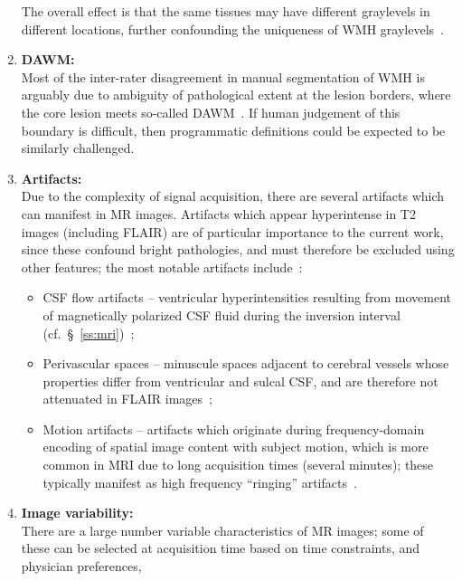 \begin{enumerate}[itemsep=0pt,topsep=0pt]
    The overall effect is that
    the same tissues may have different graylevels in different locations,
    further confounding the uniqueness of WMH graylevels~\cite{Wardlaw2015}.
  \item\label{chauto:dawm}
  \textbf{DAWM:}\\
    Most of the inter-rater disagreement in manual segmentation of WMH is arguably due to
    ambiguity of pathological extent at the lesion borders,
    where the core lesion meets so-called DAWM~\cite{Ge2003}.
    If human judgement of this boundary is difficult,
    then programmatic definitions could be expected to be similarly challenged.
  \item\label{chauto:artifacts}
  \textbf{Artifacts:}\\
    Due to the complexity of signal acquisition,
    there are several artifacts which can manifest in MR images.
    Artifacts which appear hyperintense in T2 images (including FLAIR)
    are of particular importance to the current work, since these confound bright pathologies,
    and must therefore be excluded using other features;
    the most notable artifacts include~\cite{Wardlaw2015}:
    \begin{itemize}[itemsep=0pt,topsep=0pt]
      \item CSF flow artifacts --
      ventricular hyperintensities resulting from movement of magnetically polarized CSF fluid
      during the inversion interval (cf.~\S~\ref{ss:mri})~\cite{Bakshi2000};
      \item Perivascular spaces --
      minuscule spaces adjacent to cerebral vessels
      whose properties differ from ventricular and sulcal CSF,
      and are therefore not attenuated in FLAIR images~\cite{Wardlaw2015};
      \item Motion artifacts --
      artifacts which originate during frequency-domain encoding of spatial image content
      with subject motion, which is more common in MRI due to
      long acquisition times (several minutes);
      these typically manifest as high frequency ``ringing'' artifacts~\cite{Zaitsev2015}.
    \end{itemize}
  \item\label{chauto:variability}
  \textbf{Image variability:}\\
    There are a large number variable characteristics of MR images;
    some of these can be selected at acquisition time based on
    time constraints, and physician preferences,

\end{enumerate}
